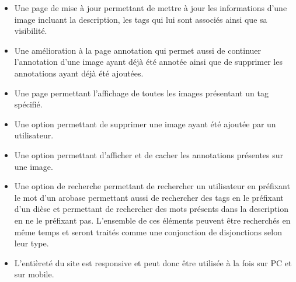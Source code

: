 \documentclass[a4paper, 12pt]{article}
\begin{document}
\begin{itemize}
    \item Une page de mise à jour permettant de mettre à jour les informations d'une image incluant la description, les tags qui lui sont associés ainsi que sa visibilité.
    
    \item Une amélioration à la page annotation qui permet aussi de continuer l'annotation d'une image ayant déjà été annotée ainsi que de supprimer les annotations ayant déjà été ajoutées.
    
    \item Une page permettant l'affichage de toutes les images présentant un tag spécifié.
    
    \item Une option permettant de supprimer une image ayant été ajoutée par un utilisateur.
    
    \item Une option permettant d'afficher et de cacher les annotations présentes sur une image.
    
    \item Une option de recherche permettant de rechercher un utilisateur en préfixant le mot d'un arobase permettant aussi de rechercher des tags en le préfixant d'un dièse et permettant de rechercher des mots présents dans la description en ne le préfixant pas. L'ensemble de ces éléments peuvent être recherchés en même temps et seront traités comme une conjonction de disjonctions selon leur type.
    
    \item L'entièreté du site est \og responsive \fg et peut donc être utilisée à la fois sur PC et sur mobile.
\end{itemize}
\end{document}
